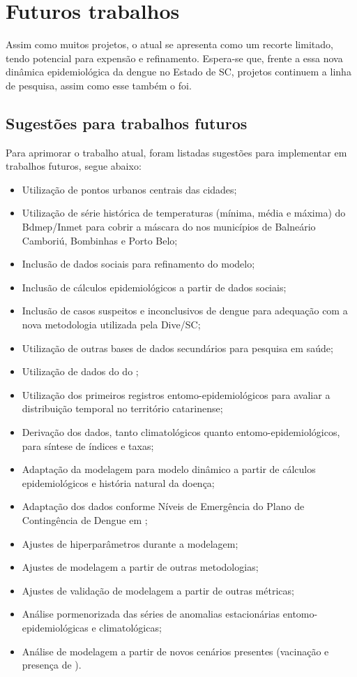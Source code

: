 \chapter{Futuros trabalhos}

\indent Assim como muitos projetos, o atual se apresenta como um recorte limitado, tendo potencial para expensão e refinamento. Espera-se que, frente a essa nova dinâmica epidemiológica da dengue no Estado de \acrlong{SC}, projetos continuem a linha de pesquisa, assim como esse também o foi.

\section{Sugestões para trabalhos futuros}

\indent Para aprimorar o trabalho atual, foram listadas sugestões para implementar em trabalhos futuros, segue abaixo:

\begin{itemize}
    \item Utilização de pontos urbanos centrais das cidades;
    \item Utilização de série histórica de temperaturas (mínima, média e máxima) do \acrfull{Bdmep/Inmet} para cobrir a máscara do  nos municípios de Balneário Camboriú, Bombinhas e Porto Belo;
    \item Inclusão de dados sociais para refinamento do modelo;
    \item Inclusão de cálculos epidemiológicos a partir de dados sociais;
    \item Inclusão de casos suspeitos e inconclusivos de dengue para adequação com a nova metodologia utilizada pela \acrshort{Dive}/\acrshort{SC};
    \item Utilização de outras bases de dados secundários para pesquisa em saúde;
    \item Utilização de dados do  do ;
    \item Utilização dos primeiros registros entomo-epidemiológicos para avaliar a distribuição temporal no território catarinense;
    \item Derivação dos dados, tanto climatológicos quanto entomo-epidemiológicos, para síntese de índices e taxas;
    \item Adaptação da modelagem para modelo dinâmico a partir de cálculos epidemiológicos e história natural da doença;
    \item Adaptação dos dados conforme Níveis de Emergência do Plano de Contingência de Dengue em ;
    \item Ajustes de hiperparâmetros durante a modelagem;
    \item Ajustes de modelagem a partir de outras metodologias;
    \item Ajustes de validação de modelagem a partir de outras métricas;
    \item Análise pormenorizada das séries de anomalias estacionárias entomo-epidemiológicas e climatológicas;
    \item Análise de modelagem a partir de novos cenários presentes (vacinação e presença de ).
\end{itemize}

